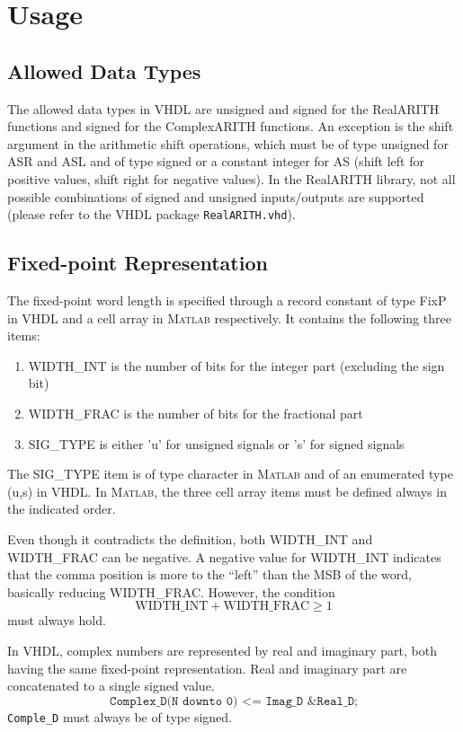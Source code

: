 \documentclass[a4paper,11pt]{article}
\begin{document}
\section{Usage}

\subsection{Allowed Data Types}
The allowed data types in VHDL are unsigned and signed for the
RealARITH functions and signed for the ComplexARITH functions. An
exception is the shift argument in the arithmetic shift operations,
which must be of type unsigned for ASR and ASL and of type signed or a
constant integer for AS (shift left for positive values, shift right
for negative values).  In the RealARITH library, not all possible
combinations of signed and unsigned inputs/outputs are supported
(please refer to the VHDL package \texttt{RealARITH.vhd}).

\subsection{Fixed-point Representation}
The fixed-point word length is specified through a record constant of
type FixP in VHDL and a cell array in \textsc{Matlab} respectively.
It contains the following three items:
\begin{enumerate}
\item WIDTH\_INT is the number of bits for the integer part (excluding
  the sign bit)
\item WIDTH\_FRAC is the number of bits for the fractional part
\item SIG\_TYPE is either 'u' for unsigned signals or 's' for signed
  signals
\end{enumerate}
The SIG\_TYPE item is of type character in \textsc{Matlab} and of an
enumerated type (u,s) in VHDL. In \textsc{Matlab}, the three cell
array items must be defined always in the indicated order.

Even though it contradicts the definition, both WIDTH\_INT and
WIDTH\_FRAC can be negative. A negative value for WIDTH\_INT indicates
that the comma position is more to the ``left'' than the MSB of the
word, basically reducing WIDTH\_FRAC. However, the condition
\begin{equation*}
  \mathrm{WIDTH\_INT} + \mathrm{WIDTH\_FRAC} \geq 1
\end{equation*}
must always hold.
 
In VHDL, complex numbers are represented by real and imaginary part,
both having the same fixed-point representation. Real and imaginary
part are concatenated to a single signed value.
\begin{equation*}
  \texttt{Complex\_D(N downto 0) <= Imag\_D \& Real\_D;}
\end{equation*}
\texttt{Comple\_D} must always be of type signed.
\end{document}
